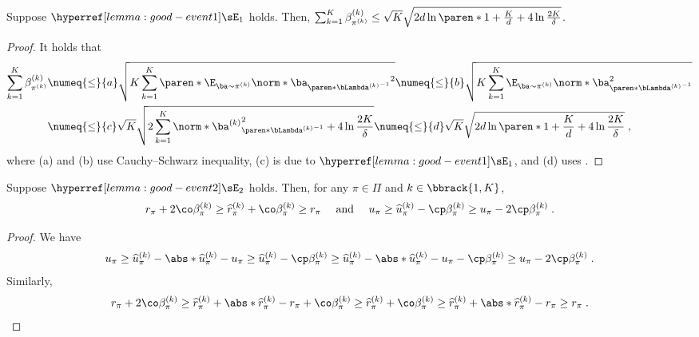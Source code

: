 \begin{lemma}\label{lemma:cumulative-bonus-bandit}
Suppose $\rmvEventBandit$ holds.
Then, $\sum_{k=1}^K\beta^{(k)}_{\pi^{(k)}} \leq \sqrt{K} \sqrt{2d\ln \paren*{1 + \frac{K}{d}} + 4 \ln \frac{2K}{\delta}}$.
\end{lemma}
\begin{proof}
It holds that
\begin{align*}
\sum_{k=1}^K\beta^{(k)}_{\pi^{(k)}}
&\numeq{\leq}{a} \sqrt{K 
\sum_{k=1}^K
\paren*{\E_{\ba \sim \pi^{(k)}} \norm*{\ba}_{\paren*{\bLambda^{(k)}}^{-1}}}^2
}
\numeq{\leq}{b} \sqrt{K 
\sum_{k=1}^K
\E_{\ba \sim \pi^{(k)}} \norm*{\ba}^2_{\paren*{\bLambda^{(k)}}^{-1}}
}\\
&\numeq{\leq}{c}  \sqrt{K}
\sqrt{2
\sum_{k=1}^K
\norm*{\ba^{(k)}}^2_{\paren*{\bLambda^{(k)}}^{-1}}
+ 4 \ln \frac{2K}{\delta}} 
\numeq{\leq}{d} \sqrt{K} \sqrt{2d\ln \paren*{1 + \frac{K}{d}} + 4 \ln \frac{2K}{\delta}}\;,
\end{align*}    
where (a) and (b) use Cauchy–Schwarz inequality, (c) is due to \(\rmvEventBandit\), and (d) uses .
\end{proof}

\begin{lemma}\label{lemma:bandit-opt-pes}
Suppose $\confeventBandit$ holds. Then, for any $\pi \in \Pi$ and $k \in \bbrack{1, K}$, 
$$
r_{\pi} + 2\co \beta^{(k)}_{\pi} \geq 
\widehat{r}_{\pi}^{(k)} + \co \beta^{(k)}_{\pi} \geq r_{\pi} \quad \text{ and }\quad
u_{\pi} \geq \widehat{u}_{\pi}^{(k)} - \cp \beta^{(k)}_{\pi}
\geq u_{\pi} - 2\cp \beta^{(k)}_{\pi}\;.
$$
\end{lemma}
\begin{proof}
We have
\begin{align*}
u_\pi
\geq 
\widehat{u}^{(k)}_\pi - \abs*{\widehat{u}^{(k)}_\pi - u_\pi} 
\geq \widehat{u}^{(k)}_\pi - \cp \beta^{(k)}_\pi
\geq \widehat{u}^{(k)}_\pi - \abs*{\widehat{u}^{(k)}_\pi - u_\pi} - \cp \beta^{(k)}_\pi
\geq u_\pi - 2\cp \beta^{(k)}_\pi\;.
\end{align*}
Similarly, 
\begin{align*}
r_\pi + 2\co \beta^{(k)}_\pi
\geq 
\widehat{r}^{(k)}_\pi + \abs*{\widehat{r}^{(k)}_\pi - r_\pi} + \co \beta^{(k)}_\pi
\geq \widehat{r}^{(k)}_\pi + \co \beta^{(k)}_\pi
\geq \widehat{r}^{(k)}_\pi + \abs*{\widehat{r}^{(k)}_\pi - r_\pi}
\geq r_\pi\;.
\end{align*}
\end{proof}

